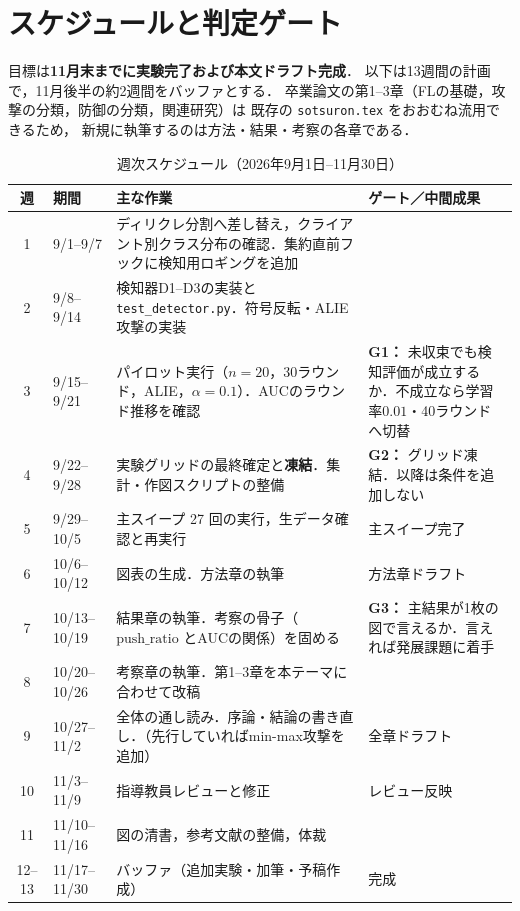 \documentclass[a4j, dvipdfmx]{jsarticle}  %
\begin{document}
\section{スケジュールと判定ゲート}
\label{sec:schedule}

目標は\textbf{11月末までに実験完了および本文ドラフト完成}．
以下は13週間の計画で，11月後半の約2週間をバッファとする．
卒業論文の第1--3章（FLの基礎，攻撃の分類，防御の分類，関連研究）は
既存の \texttt{sotsuron.tex} をおおむね流用できるため，
新規に執筆するのは方法・結果・考察の各章である．

\begin{table}[H]
\centering
\caption{週次スケジュール（2026年9月1日--11月30日）}
\begin{tabular}{@{}c P{2.4cm} P{7.4cm} P{3.6cm}@{}}
\toprule
週 & 期間 & 主な作業 & ゲート／中間成果 \\
 & 9/1--9/7 & ディリクレ分割へ差し替え，クライアント別クラス分布の確認．集約直前フックに検知用ロギングを追加 & \\
2 & 9/8--9/14 & 検知器D1--D3の実装と \texttt{test\_detector.py}．符号反転・ALIE攻撃の実装 & \\
3 & 9/15--9/21 & パイロット実行（$n=20$，30ラウンド，ALIE，$\alpha=0.1$）．AUCのラウンド推移を確認 & \textbf{G1：} 未収束でも検知評価が成立するか．不成立なら学習率$0.01$・40ラウンドへ切替 \\
4 & 9/22--9/28 & 実験グリッドの最終確定と\textbf{凍結}．集計・作図スクリプトの整備 & \textbf{G2：} グリッド凍結．以降は条件を追加しない \\
5 & 9/29--10/5 & 主スイープ 27 回の実行，生データ確認と再実行 & 主スイープ完了 \\
6 & 10/6--10/12 & 図表の生成．方法章の執筆 & 方法章ドラフト \\
7 & 10/13--10/19 & 結果章の執筆．考察の骨子（$\mathrm{push\_ratio}$ とAUCの関係）を固める & \textbf{G3：} 主結果が1枚の図で言えるか．言えれば発展課題に着手 \\
8 & 10/20--10/26 & 考察章の執筆．第1--3章を本テーマに合わせて改稿 & \\
9 & 10/27--11/2 & 全体の通し読み．序論・結論の書き直し．（先行していればmin-max攻撃を追加） & 全章ドラフト \\
10 & 11/3--11/9 & 指導教員レビューと修正 & レビュー反映 \\
11 & 11/10--11/16 & 図の清書，参考文献の整備，体裁 & \\
12--13 & 11/17--11/30 & バッファ（追加実験・加筆・予稿作成） & 完成 \\
\bottomrule
\end{tabular}
\end{table}
\end{document}

